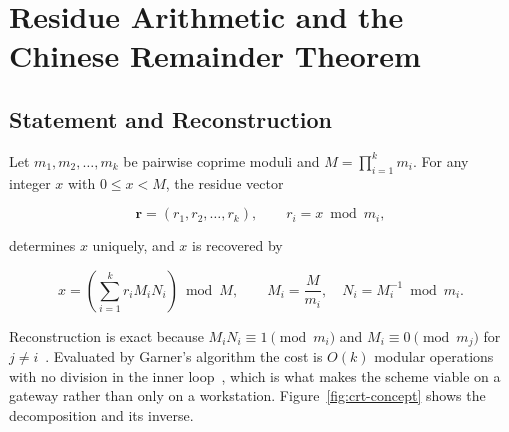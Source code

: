 \documentclass[12pt,a4paper,oneside]{book}
\begin{document}
\section{Residue Arithmetic and the Chinese Remainder Theorem}
\label{sec:lit_crt}

\subsection{Statement and Reconstruction}

Let $m_1, m_2, \ldots, m_k$ be pairwise coprime moduli and
$M = \prod_{i=1}^{k} m_i$. For any integer $x$ with $0 \le x < M$, the residue
vector

\begin{equation}
  \mathbf{r} = (r_1, r_2, \ldots, r_k), \qquad r_i = x \bmod m_i,
  \label{eq:residues}
\end{equation}

determines $x$ uniquely, and $x$ is recovered by

\begin{equation}
  x = \left( \sum_{i=1}^{k} r_i M_i N_i \right) \bmod M,
  \qquad M_i = \frac{M}{m_i}, \quad N_i = M_i^{-1} \bmod m_i .
  \label{eq:crt_reconstruction}
\end{equation}

Reconstruction is exact because $M_i N_i \equiv 1 \pmod{m_i}$ and
$M_i \equiv 0 \pmod{m_j}$ for $j \neq i$~\cite{hardy2008introduction,
ding1996remainder}. Evaluated by Garner's algorithm the cost is $O(k)$ modular
operations with no division in the inner loop~\cite{garner1959residue}, which is
what makes the scheme viable on a gateway rather than only on a workstation.
Figure~\ref{fig:crt-concept} shows the decomposition and its inverse.
\end{document}
